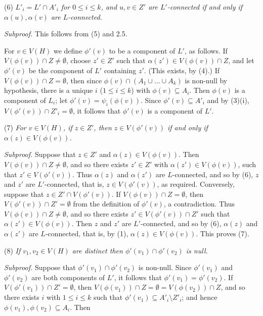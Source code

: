 \hspace*{12pt}(6) \textit{$L'_i = L' \cap A'_i$ for $0 \le i \le k$, and $u, v \in Z'$ are $L'$-connected if and only if $\alpha(u), \alpha(v)$ are $L$-connected.}

\textit{Subproof.} This follows from (5) and 2.5.

For $v \in V(H)$ we define $\phi'(v)$ to be a component of $L'$, as follows. If $V(\phi(v)) \cap Z \ne \emptyset$, choose $z' \in Z'$ such that $\alpha(z') \in V(\phi(v)) \cap Z$, and let $\phi'(v)$ be the component of $L'$ containing $z'$. (This exists, by (4).) If $V(\phi(v)) \cap Z = \emptyset$, then since $\phi(v) \cap (A_1 \cup \dots \cup A_k)$ is non-null by hypothesis, there is a unique $i$ ($1 \le i \le k$) with $\phi(v) \subseteq A_i$. Then $\phi(v)$ is a component of $L_i$; let $\phi'(v) = \psi_i(\phi(v))$. Since $\phi'(v) \subseteq A'_i$ and by (3)(i), $V(\phi'(v)) \cap Z'_i = \emptyset$, it follows that $\phi'(v)$ is a component of $L'$.

\hspace*{12pt}(7) \textit{For $v \in V(H)$, if $z \in Z'$, then $z \in V(\phi'(v))$ if and only if $\alpha(z) \in V(\phi(v))$.}

\textit{Subproof.} Suppose that $z \in Z'$ and $\alpha(z) \in V(\phi(v))$. Then $V(\phi(v)) \cap Z \ne \emptyset$, and so there exists $z' \in Z'$ with $\alpha(z') \in V(\phi(v))$, such that $z' \in V(\phi'(v))$. Thus $\alpha(z)$ and $\alpha(z')$ are $L$-connected, and so by (6), $z$ and $z'$ are $L'$-connected, that is, $z \in V(\phi'(v))$, as required. Conversely, suppose that $z \in Z' \cap V(\phi'(v))$. If $V(\phi(v)) \cap Z = \emptyset$, then $V(\phi'(v)) \cap Z' = \emptyset$ from the definition of $\phi'(v)$, a contradiction. Thus $V(\phi(v)) \cap Z \ne \emptyset$, and so there exists $z' \in V(\phi'(v)) \cap Z'$ such that $\alpha(z') \in V(\phi(v))$. Then $z$ and $z'$ are $L'$-connected, and so by (6), $\alpha(z)$ and $\alpha(z')$ are $L$-connected, that is, by (1), $\alpha(z) \in V(\phi(v))$. This proves (7).

\hspace*{12pt}(8) \textit{If $v_1, v_2 \in V(H)$ are distinct then $\phi'(v_1) \cap \phi'(v_2)$ is null.}

\textit{Subproof.} Suppose that $\phi'(v_1) \cap \phi'(v_2)$ is non-null. Since $\phi'(v_1)$ and $\phi'(v_2)$ are both components of $L'$, it follows that $\phi'(v_1) = \phi'(v_2)$. If $V(\phi'(v_1)) \cap Z' = \emptyset$, then $V(\phi(v_1)) \cap Z = \emptyset = V(\phi(v_2)) \cap Z$, and so there exists $i$ with $1 \le i \le k$ such that $\phi'(v_1) \subseteq A'_i \setminus Z'_i$; and hence $\phi(v_1), \phi(v_2) \subseteq A_i$. Then
